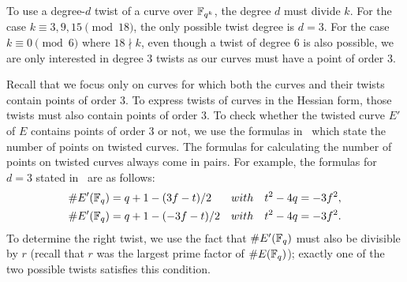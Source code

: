 To use a degree-$d$ twist of a curve over $\mathbb{F}_{q^{k}}$, the degree $d$ must divide $k$.
For the case $k \equiv 3,9,15 \pmod{18}$,
the only possible twist degree is $d = 3$.
For the case $k \equiv 0 \pmod{6}$ where $18 \nmid k$,
even though a twist of degree 6 is also possible, we are only interested in degree 3 twists as our curves must have a point of order 3.

Recall that we focus only on curves for which both the curves and their twists contain points of order 3.
To express twists of curves in the Hessian form,
those twists must also contain points of order 3.
To check whether the twisted curve $E'$ of $E$ contains points of order 3 or not,
we use the formulas in~\cite{2006/hess} which state the number of points on twisted curves.
The formulas for calculating the number of points on twisted curves always come in pairs.
For example, the formulas for $d = 3$ stated in~\cite{2006/hess} are as follows:
\begin{align*}
\# E' (\mathbb{F}_{q}) &= q + 1 - (3f - t) / 2 & with & \quad t^2 - 4q = -3f^2, \\
\# E' (\mathbb{F}_{q}) &= q + 1 - (-3f- t) / 2 & with & \quad t^2 - 4q = -3f^2.
\end{align*}
To determine the right twist,
we use the fact that $\#E'(\mathbb{F}_{q})$ must also be divisible by $r$ (recall that $r$ was the largest prime factor of $\# E(\mathbb{F}_{q})$); exactly one of the two possible twists satisfies this condition.



